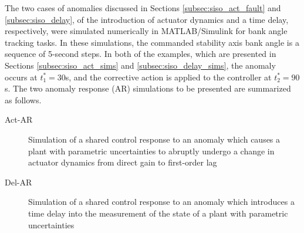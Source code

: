 The two cases of anomalies discussed in Sections \ref{subsec:siso_act_fault} and \ref{subsec:siso_delay}, of the introduction of actuator dynamics and a time delay, respectively, were simulated numerically in MATLAB/Simulink for bank angle tracking tasks. In these simulations, the commanded stability axis bank angle is a sequence of 5-second steps. In both of the examples, which are presented in Sections \ref{subsec:siso_act_sims} and \ref{subsec:siso_delay_sims}, the anomaly occurs at $t_1^* = 30$s, and the corrective action is applied to the controller at $t_2^* = 90$s. The two anomaly response (AR) simulations to be presented are summarized as follows.
\begin{description}
	\item[Act-AR] Simulation of a shared control response to an anomaly which causes a plant with parametric uncertainties to abruptly undergo a change in actuator dynamics from direct gain to first-order lag
	\item[Del-AR] Simulation of a shared control response to an anomaly which introduces a time delay into the measurement of the state of a plant with parametric uncertainties
\end{description}


